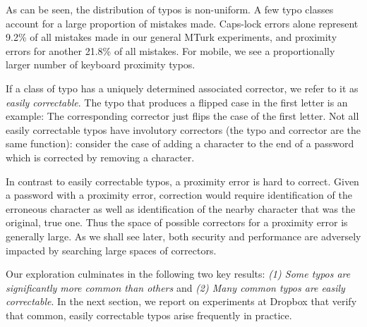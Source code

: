 As can be seen, the distribution of typos is non-uniform. A few typo classes
account for a large proportion of mistakes made. Caps-lock errors alone
represent 9.2\% of all mistakes made in our general MTurk experiments, and
proximity errors for another 21.8\% of all mistakes.
For mobile, we see a proportionally larger number of keyboard
proximity typos.


If a class of typo has a uniquely determined associated corrector, we refer to
it as {\em easily correctable}. The typo that produces a flipped case in the
first letter is an example: The corresponding corrector just flips the case of
the first letter. Not all easily correctable typos have involutory correctors
(the typo and corrector are the same function): consider the case of adding a
character to the end of a password which is corrected by removing a character. 

In contrast to easily correctable typos, a proximity error is hard to correct.
Given a password with a proximity error, correction would require
identification of the erroneous character as well as identification of the
nearby character that was the original, true one. Thus the space of possible
correctors for a proximity error is generally large. As we shall see later,
both security and performance are adversely impacted by searching large spaces
of correctors.


Our exploration culminates in the following two key results: {\em (1) Some typos
are significantly more common than others} and {\em (2) Many common typos are
easily correctable}. In the next section, we report on experiments at Dropbox
that verify that common, easily correctable typos arise frequently in practice.







